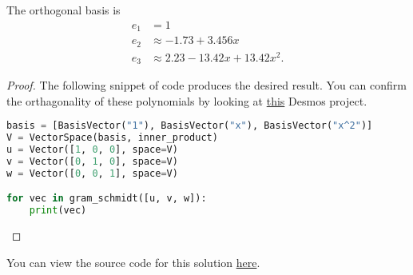 \documentclass{amsart}
\newcommand{\pagenum}{190}
\newcommand{\probnum}{5}
\begin{document}
\begin{claim*}
The orthogonal basis is
\begin{align*}
    e_1 &= 1 \\
    e_2 &\approx -1.73+3.456x \\
    e_3 &\approx 2.23-13.42x+13.42x^2.
\end{align*}
\end{claim*}
\begin{proof}
The following snippet of code produces the desired result.
You can confirm the orthagonality of these polynomials
by looking at \href{https://www.desmos.com/calculator/3z6r9ky3wr}
{this} Desmos project.

\lstset{style=mystyle}
\begin{lstlisting}[language=Python]
basis = [BasisVector("1"), BasisVector("x"), BasisVector("x^2")]
V = VectorSpace(basis, inner_product)
u = Vector([1, 0, 0], space=V)
v = Vector([0, 1, 0], space=V)
w = Vector([0, 0, 1], space=V)

for vec in gram_schmidt([u, v, w]):
    print(vec)
\end{lstlisting}
\end{proof}


\begin{note*}
You can view the source code for this solution
\href{https://github.com/thomasbreydo/linalg/blob/main/\pagenum_\probnum_Thomas_Breydo.tex}
{here}.
\end{note*}
\end{document}
